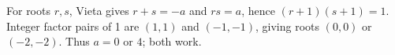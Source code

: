 For roots $ r,s $, Vieta gives $ r+s=-a $ and $ rs=a $, hence $(r+1)(s+1)=1 $. Integer factor pairs of 1 are $(1,1)$ and $(-1,-1)$, giving roots $(0,0)$ or $(-2,-2)$. Thus $\boxed{a=0\text{ or }4}$; both work.
